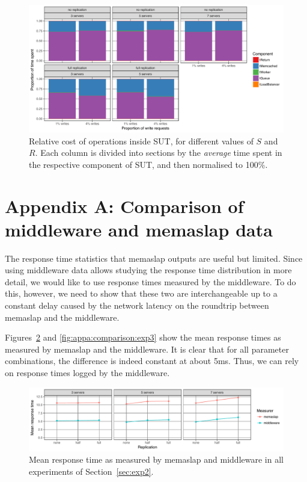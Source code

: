 \documentclass[11pt]{article}
\begin{document}
\begin{figure}[h]
\centering
\includegraphics[width=\textwidth]{../results/writes/graphs/time_breakdown_vs_writes_set_rel.pdf}
\caption{Relative cost of operations inside SUT, for different values of $S$ and $R$. Each column is divided into sections by the \emph{average} time spent in the respective component of SUT, and then normalised to 100\%.}
\label{fig:exp3:res:breakdown:set:rel}
\end{figure}


\clearpage

\section*{Appendix A: Comparison of middleware and memaslap data}
\label{sec:appa}

The response time statistics that memaslap outputs are useful but limited. Since using middleware data allows studying the response time distribution in more detail, we would like to use response times measured by the middleware. To do this, however, we need to show that these two are interchangeable up to a constant delay caused by the network latency on the roundtrip between memaslap and the middleware.

Figures~\ref{fig:appa:comparison:exp2} and \ref{fig:appa:comparison:exp3} show the mean response times as measured by memaslap and the middleware. It is clear that for all parameter combinations, the difference is indeed constant at about 5ms. Thus, we can rely on response times logged by the middleware.

\begin{figure}[h]
\centering
\includegraphics[width=\textwidth]{../results/replication/graphs/compare_mw_ms.pdf}
\caption{Mean response time as measured by memaslap and middleware in all experiments of Section~\ref{sec:exp2}.}
\label{fig:appa:comparison:exp2}
\end{figure}
\end{document}
